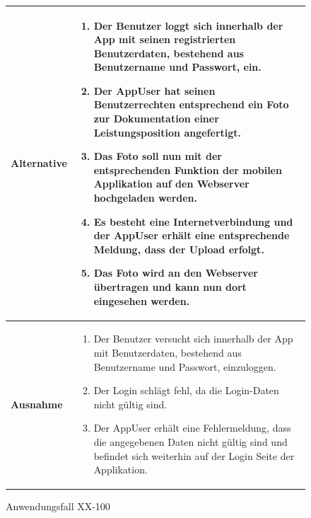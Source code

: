 			\begin{figure}[h]
	\centering
	\begin{tabularx}{\textwidth}{ X | X }
		\textbf{Alternative} & 
				\begin{enumerate}
					\item Der Benutzer loggt sich innerhalb der App mit seinen registrierten Benutzerdaten, bestehend aus Benutzername und Passwort,  ein.  
					 \item Der AppUser hat seinen Benutzerrechten entsprechend ein Foto zur Dokumentation einer Leistungsposition angefertigt.
					 \item Das Foto soll nun mit der entsprechenden Funktion der mobilen Applikation auf den Webserver hochgeladen werden.
					 \item Es besteht eine Internetverbindung und der AppUser erh\"alt eine entsprechende Meldung,  dass der Upload erfolgt.
					 \item Das Foto wird an den Webserver \"ubertragen und kann nun dort eingesehen werden.
				\end{enumerate}  \\ \hline
		\textbf{Ausnahme} &
				\begin{enumerate}
					\item Der Benutzer versucht sich innerhalb der App mit Benutzerdaten,  bestehend aus Benutzername und Passwort,  einzuloggen.  
					\item Der Login schl\"agt fehl,  da die Login-Daten nicht g\"ultig sind. 
					\item Der AppUser erh\"alt eine Fehlermeldung, dass die angegebenen Daten nicht g\"ultig sind und befindet sich weiterhin auf der Login Seite der Applikation.
				\end{enumerate} 
	\end{tabularx}
	\caption{Anwendungsfall XX-100}
	\label{fig:anwendungsfall-app-tabelle-xx-2}
\end{figure}
